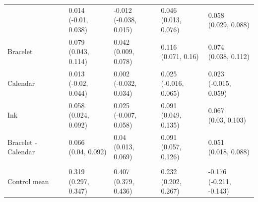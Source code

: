 \documentclass[
]{article}
\begin{document}
\begin{table}
{\begin{tabular}[t]{lllll}
\addlinespace[0.3em]
\hline
\multicolumn{5}{l}{\textit{\textbf{Panel B: Signalling}}}\\
\hline
\hspace{1em} & \makecell[c]{0.014\\(-0.01, 0.038)} & \makecell[c]{-0.012\\(-0.038, 0.015)} & \makecell[c]{0.046\\(0.013, 0.076)} & \makecell[c]{0.058\\(0.029, 0.088)}\\
\hspace{1em}Bracelet & \makecell[c]{0.079\\(0.043, 0.114)} & \makecell[c]{0.042\\(0.009, 0.078)} & \makecell[c]{0.116\\(0.071, 0.16)} & \makecell[c]{0.074\\(0.038, 0.112)}\\
\hspace{1em}Calendar & \makecell[c]{0.013\\(-0.02, 0.044)} & \makecell[c]{0.002\\(-0.032, 0.034)} & \makecell[c]{0.025\\(-0.016, 0.065)} & \makecell[c]{0.023\\(-0.015, 0.059)}\\
\midrule
\hspace{1em}Ink & \makecell[c]{0.058\\(0.024, 0.092)} & \makecell[c]{0.025\\(-0.007, 0.058)} & \makecell[c]{0.091\\(0.049, 0.135)} & \makecell[c]{0.067\\(0.03, 0.103)}\\
\hspace{1em}Bracelet - Calendar & \makecell[c]{0.066\\(0.04, 0.092)} & \makecell[c]{0.04\\(0.013, 0.069)} & \makecell[c]{0.091\\(0.057, 0.126)} & \makecell[c]{0.051\\(0.018, 0.088)}\\
\addlinespace[0.3em]
\hline
\multicolumn{5}{l}{\textit{\textbf{Panel C: Private}}}\\
\hline
\hspace{1em}Control mean & \makecell[c]{0.319\\(0.297, 0.347)} & \makecell[c]{0.407\\(0.379, 0.436)} & \makecell[c]{0.232\\(0.202, 0.267)} & \makecell[c]{-0.176\\(-0.211, -0.143)}\\

\end{tabular}}
\end{table}
\end{document}
